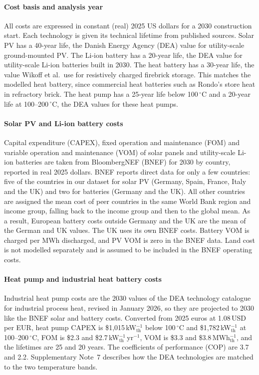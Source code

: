 \documentclass[11pt]{article}
\begin{document}
\paragraph*{Cost basis and analysis year}
All costs are expressed in constant (real) 2025 US dollars for a 2030 construction start. Each technology is given its technical lifetime from published sources. Solar PV has a 40-year life, the Danish Energy Agency (DEA) value for utility-scale ground-mounted PV\cite{dea2026electricity}. The Li-ion battery has a 20-year life, the DEA value for utility-scale Li-ion batteries built in 2030\cite{dea2026storage}. The heat battery has a 30-year life, the value Wikoff et al.\ use for resistively charged firebrick storage\cite{wikoff2025}. This matches the modelled heat battery, since commercial heat batteries such as Rondo's store heat in refractory brick\cite{rondo2026datasheet}. The heat pump has a 25-year life below 100\,$^\circ$C and a 20-year life at 100--200\,$^\circ$C, the DEA values for these heat pumps\cite{dea2026processheat}.

\paragraph*{Solar PV and Li-ion battery costs}
Capital expenditure (CAPEX), fixed operation and maintenance (FOM) and variable operation and maintenance (VOM) of solar panels and utility-scale Li-ion batteries are taken from BloombergNEF (BNEF)\cite{bnef2024lcoe} for 2030 by country, reported in real 2025 dollars. BNEF reports direct data for only a few countries: five of the countries in our dataset for solar PV (Germany, Spain, France, Italy and the UK) and two for batteries (Germany and the UK). All other countries are assigned the mean cost of peer countries in the same World Bank region and income group, falling back to the income group and then to the global mean. As a result, European battery costs outside Germany and the UK are the mean of the German and UK values. The UK uses its own BNEF costs. Battery VOM is charged per MWh discharged, and PV VOM is zero in the BNEF data. Land cost is not modelled separately and is assumed to be included in the BNEF operating costs.

\paragraph*{Heat pump and industrial heat battery costs}
Industrial heat pump costs are the 2030 values of the DEA technology catalogue for industrial process heat\cite{dea2026processheat}, revised in January 2026, so they are projected to 2030 like the BNEF solar and battery costs. Converted from 2025 euros at 1.08\,USD per EUR, heat pump CAPEX is \$1,015\,kW$_\mathrm{th}^{-1}$ below 100\,$^\circ$C and \$1,782\,kW$_\mathrm{th}^{-1}$ at 100--200\,$^\circ$C, FOM is \$2.3 and \$2.7\,kW$_\mathrm{th}^{-1}$\,yr$^{-1}$, VOM is \$3.3 and \$3.8\,MWh$_\mathrm{th}^{-1}$, and the lifetimes are 25 and 20 years\cite{dea2026processheat}. The coefficients of performance (COP) are 3.7 and 2.2\cite{rissman2020}. Supplementary Note~7 describes how the DEA technologies are matched to the two temperature bands.
\end{document}

